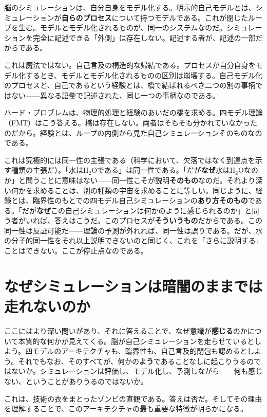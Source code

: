 \documentclass[11pt, twoside, openright]{book}
\begin{document}
脳のシミュレーションは、自分自身をモデル化する。明示的自己モデルとは、シミュレーションが\textbf{自らのプロセス}について持つモデルである。これが閉じたループを生む。モデルとモデル化されるものが、同一のシステムなのだ。シミュレーションを完全に記述できる「外側」は存在しない。記述する者が、記述の一部だからである。

これは魔法ではない。自己言及の構造的な帰結である。プロセスが自分自身をモデル化するとき、モデルとモデル化されるものの区別は崩壊する。自己モデル化のプロセスと、自己であるという経験とは、橋で結ばれるべき二つの別の事柄ではない------異なる語彙で記述された、同じ一つの事柄なのである。

ハード・プロブレムは、物理的処理と経験のあいだの橋を求める。四モデル理論（FMT）はこう答える。橋は存在しない。両者はそもそも分かれていなかったのだから。経験とは、ループの内側から見た自己シミュレーションそのものなのである。

これは究極的には同一性の主張である（科学において、欠落ではなく到達点を示す種類の主張だ）。「水はH$_2$Oである」は同一性である。「だが\textbf{なぜ}水はH$_2$Oなのか」と問うことに意味はない------同一性こそが説明\textbf{そのもの}なのだ。それより深い何かを求めることは、別の種類の宇宙を求めることに等しい。同じように、経験とは、臨界性のもとでの四モデル自己シミュレーションの\textbf{あり方そのもの}である。「だが\textbf{なぜ}この自己シミュレーションは何かのように感じられるのか」と問う者がいれば、答えはこうだ。このプロセスが\textbf{そういうもの}だからである。この同一性は反証可能だ------理論の予測が外れれば、同一性は誤りである。だが、水の分子的同一性をそれ以上説明できないのと同じく、これを「さらに説明する」ことはできない。ここが停止点なのである。

\section*{なぜシミュレーションは暗闇のままでは走れないのか}

ここにはより深い問いがあり、それに答えることで、なぜ意識が\textbf{感じる}のかについて本質的な何かが見えてくる。脳が自己シミュレーションを走らせているとしよう。四モデルのアーキテクチャも、臨界性も、自己言及的閉包も認めるとしよう。それでもなお、そのすべてが、何かの\textbf{よう}であることなしに起こりうるのではないか。シミュレーションは評価し、モデル化し、予測しながら------何も感じない、ということがありうるのではないか。

これは、技術の衣をまとったゾンビの直観である。答えは否だ。そしてその理由を理解することで、このアーキテクチャの最も重要な特徴が明らかになる。
\end{document}
